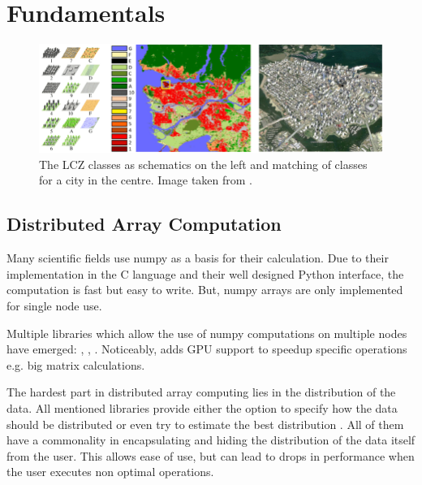 \section{Fundamentals}
\label{sec:fundamentals}

\begin{figure}[t]
  \centering
  \includegraphics[width=0.9\linewidth]{images/schematic-lcz.png}
  \caption{The LCZ classes as schematics on the left and matching of classes for a city in the centre. Image taken from \cite{zhu_so2sat_2019}.}\label{fig:lcz_classes}
\end{figure}


\subsection{Distributed Array Computation}
\label{subsec:distributed_array_computation}
Many scientific fields use \gls{numpy} as a basis for their calculation. Due to their implementation in the C language and their well designed
Python interface, the computation is fast but easy to write. But, \gls{numpy} arrays are only implemented for single node use.

Multiple libraries which allow the use of \gls{numpy} computations on multiple nodes have emerged: \cite{bauer_legate_2019}, \cite{huang_spartan_nodate}, \cite{krajsek_helmholtz_nodate}.
Noticeably, \cite{bauer_legate_2019} adds \gls{GPU} support to speedup specific operations e.g. big matrix calculations.

The hardest part in distributed array computing lies in the distribution of the data. All mentioned libraries provide
either the option to specify how the data should be distributed or even try to estimate the best distribution \cite{huang_spartan_nodate}.
All of them have a commonality in encapsulating and hiding the distribution of the data itself from the user.
This allows ease of use, but can lead to drops in performance when the user executes non optimal operations.


